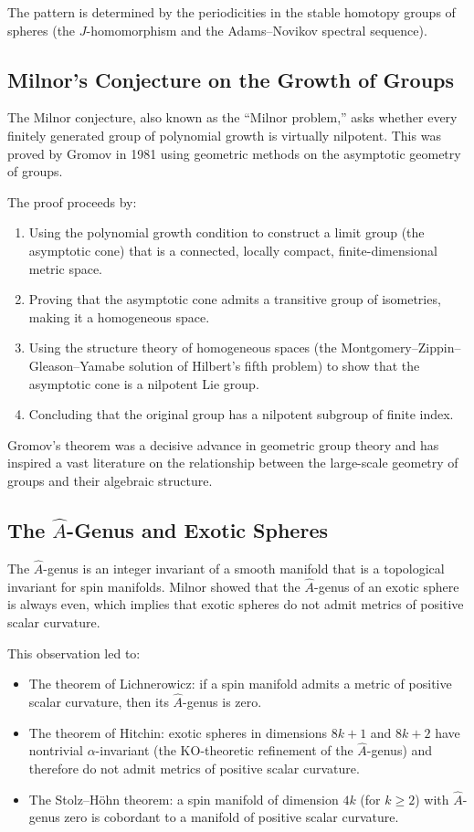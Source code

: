 The pattern is determined by the periodicities in the stable homotopy groups of spheres (the $J$-homomorphism and the Adams--Novikov spectral sequence).

\subsection{Milnor's Conjecture on the Growth of Groups}

The Milnor conjecture, also known as the ``Milnor problem,'' asks whether every finitely generated group of polynomial growth is virtually nilpotent. This was proved by Gromov in 1981 using geometric methods on the asymptotic geometry of groups.

The proof proceeds by:
\begin{enumerate}
\item Using the polynomial growth condition to construct a limit group (the asymptotic cone) that is a connected, locally compact, finite-dimensional metric space.
\item Proving that the asymptotic cone admits a transitive group of isometries, making it a homogeneous space.
\item Using the structure theory of homogeneous spaces (the Montgomery--Zippin--Gleason--Yamabe solution of Hilbert's fifth problem) to show that the asymptotic cone is a nilpotent Lie group.
\item Concluding that the original group has a nilpotent subgroup of finite index.
\end{enumerate}

Gromov's theorem was a decisive advance in geometric group theory and has inspired a vast literature on the relationship between the large-scale geometry of groups and their algebraic structure.

\subsection{The \texorpdfstring{$\hat{A}$}{A}-Genus and Exotic Spheres}

The $\hat{A}$-genus is an integer invariant of a smooth manifold that is a topological invariant for spin manifolds. Milnor showed that the $\hat{A}$-genus of an exotic sphere is always even, which implies that exotic spheres do not admit metrics of positive scalar curvature.

This observation led to:
\begin{itemize}
\item The theorem of Lichnerowicz: if a spin manifold admits a metric of positive scalar curvature, then its $\hat{A}$-genus is zero.
\item The theorem of Hitchin: exotic spheres in dimensions $8k+1$ and $8k+2$ have nontrivial $\alpha$-invariant (the KO-theoretic refinement of the $\hat{A}$-genus) and therefore do not admit metrics of positive scalar curvature.
\item The Stolz--Höhn theorem: a spin manifold of dimension $4k$ (for $k \geq 2$) with $\hat{A}$-genus zero is cobordant to a manifold of positive scalar curvature.
\end{itemize}


